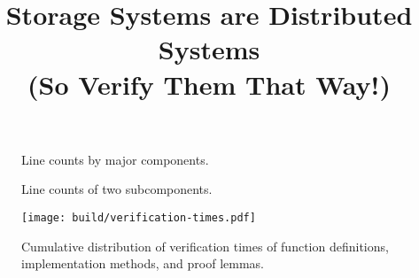 \documentclass[10pt,twocolumn]{article}
\title{\vspace{-2mm}
Storage Systems are Distributed Systems\\
(So Verify Them That Way!)
\\\vspace{2mm}{\large\textbf{OSDI 2020 Artifact Reprodcubility Experiment Results}}
}
\date{}
\begin{document}
\maketitle



\begin{figure}
\begin{center}

\end{center}
  \vspace{-3mm}
\caption{Line counts by major components.}
\label{line-counts}
\end{figure}

\begin{figure}
  \begin{center}
    

  \end{center}
  \vspace{-3mm}
  \caption{Line counts of two subcomponents.
  }
  \label{line-counts-micro}
  \vspace{-2mm}
\end{figure}

\begin{figure}
\texttt{[image: build/verification-times.pdf]}
  \vspace{-5mm}
\caption{Cumulative distribution of verification times of function
  definitions, implementation methods, and proof lemmas.
  }
  \vspace{-4mm}
\label{verification-times}
\end{figure}
\end{document}
